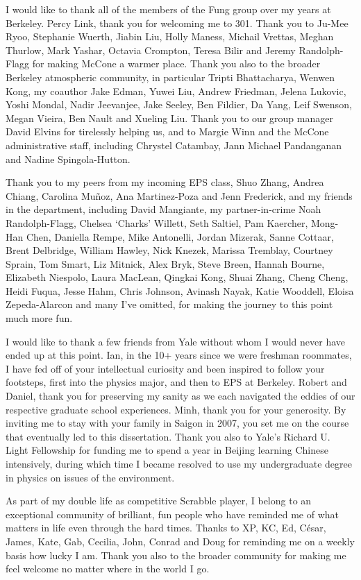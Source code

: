 \documentclass{ucbthesis}
\begin{document}
\begin{frontmatter}
\begin{acknowledgements}
I would like to thank all of the members of the Fung group over my years at Berkeley. Percy Link, thank you for welcoming me to 301. Thank you to Ju-Mee Ryoo, Stephanie Wuerth, Jiabin Liu, Holly Maness, Michail Vrettas, Meghan Thurlow, Mark Yashar, Octavia Crompton, Teresa Bilir and Jeremy Randolph-Flagg for making McCone a warmer place. Thank you also to the broader Berkeley atmospheric community, in particular Tripti Bhattacharya, Wenwen Kong, my coauthor Jake Edman, Yuwei Liu, Andrew Friedman, Jelena Lukovic, Yoshi Mondal, Nadir Jeevanjee, Jake Seeley, Ben Fildier, Da Yang, Leif Swenson, Megan Vieira, Ben Nault and Xueling Liu. Thank you to our group manager David Elvins for tirelessly helping us, and to Margie Winn and the McCone administrative staff, including Chrystel Catambay, Jann Michael Pandanganan and Nadine Spingola-Hutton.

Thank you to my peers from my incoming EPS class, Shuo Zhang, Andrea Chiang, Carolina Mu\~{n}oz, Ana Martinez-Poza and Jenn Frederick, and my friends in the department, including David Mangiante, my partner-in-crime Noah Randolph-Flagg, Chelsea `Charks' Willett, Seth Saltiel, Pam Kaercher, Mong-Han Chen, Daniella Rempe, Mike Antonelli, Jordan Mizerak, Sanne Cottaar, Brent Delbridge, William Hawley, Nick Knezek, Marissa Tremblay, Courtney Sprain, Tom Smart, Liz Mitnick, Alex Bryk, Steve Breen, Hannah Bourne, Elizabeth Niespolo, Laura MacLean, Qingkai Kong, Shuai Zhang, Cheng Cheng, Heidi Fuqua, Jesse Hahm, Chris Johnson, Avinash Nayak, Katie Wooddell, Eloisa Zepeda-Alarcon and many I've omitted, for making the journey to this point much more fun. 

I would like to thank a few friends from Yale without whom I would never have ended up at this point. Ian, in the 10+ years since we were freshman roommates, I have fed off of your intellectual curiosity and been inspired to follow your footsteps, first into the physics major, and then to EPS at Berkeley. Robert and Daniel, thank you for preserving my sanity as we each navigated the eddies of our respective graduate school experiences. Minh, thank you for your generosity. By inviting me to stay with your family in Saigon in 2007, you set me on the course that eventually led to this dissertation. Thank you also to Yale's Richard U. Light Fellowship for funding me to spend a year in Beijing learning Chinese intensively, during which time I became resolved to use my undergraduate degree in physics on issues of the environment.

As part of my double life as competitive Scrabble player, I belong to an exceptional community of brilliant, fun people who have reminded me of what matters in life even through the hard times. Thanks to XP, KC, Ed, C\'{e}sar, James, Kate, Gab, Cecilia, John, Conrad and Doug for reminding me on a weekly basis how lucky I am. Thank you also to the broader community for making me feel welcome no matter where in the world I go.


\end{acknowledgements}
\end{frontmatter}
\end{document}
